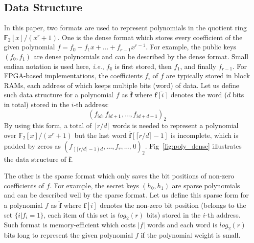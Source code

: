 \documentclass[preprint]{iacrtrans}
\begin{document}
\subsection{Data Structure}
In this paper, two formats are used to represent polynomials in the quotient ring $\mathbb{F}_2[x]/(x^r+1)$. One is the dense format which stores every coefficient of the given polynomial $f=f_0+f_1x+\ldots +f_{r-1}x^{r-1}$. For example, the public keys $(f_0, f_1)$ are dense polynomials and can be described by the dense format. Small endian notation is used here, \textit{i.e.}, $f_0$ is first stored, then $f_1$, and finally $f_{r-1}$.
For FPGA-based implementations, the coefficients $f_i$ of $f$ are typically stored in block RAMs, each address of which keeps multiple bits (word) of data. Let us define such data structure for a polynomial $f$ as $\overline{\mathbf{f}}$ where $\overline{\mathbf{f}[i]}$ denotes the word ($d$ bits in total) stored in the $i$-th address:
\[
(f_{id},f_{id+1},\ldots,f_{id+d-1})_2
\]
By using this form, a total of $\lceil r/d \rceil$ words is needed to represent a polynomial over $\mathbb{F}_2[x]/(x^r+1)$ but the last word  $\mathbf{\overline{f}}[\lceil r/d \rceil-1]$ is incomplete, which is padded by zeros as $(f_{(\lceil r/d\rceil-1)d},\ldots, f_{r},\ldots,0)_2$. Fig~\ref{fig:poly_dense} illustrates the data structure of $\overline{\mathbf{f}}$.

The other is the sparse format which only saves the bit positions of non-zero coefficients of $f$. For example, the secret keys $(h_0, h_1)$ are sparse polynomials and can be described well by the sparse format. Let us define this sparse form for a polynomial $f$ as $\mathbf{\hat{f}}$ where
$\hat{\mathbf{f}[i]}$ denotes the non-zero bit position (belongs to the set $\{i|f_i=1\}$, each item of this set is $log_2(r)$ bits) stored in the $i$-th address.
Such format is memory-efficient which costs $|f|$ words and each word is $log_2(r)$ bits long to represent the given polynomial $f$ if the polynomial weight is small.
\end{document}
